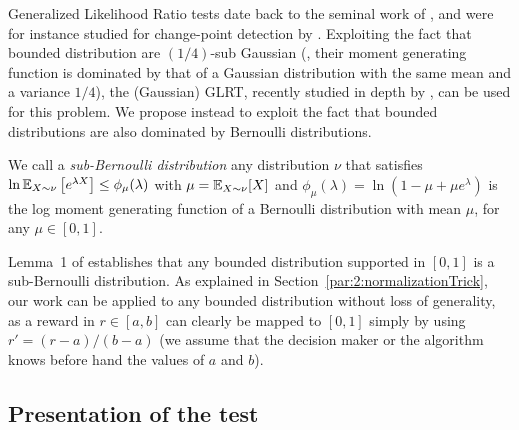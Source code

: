 Generalized Likelihood Ratio tests date back to the seminal work of \cite{Wilks1938}, and were for instance studied for change-point detection by \cite{barnard1959control,siegmund1995using}.
Exploiting the fact that bounded distribution are $(1/4)$-sub Gaussian (\ie, their moment generating function is dominated by that of a Gaussian distribution with the same mean and a variance $1/4$), the (Gaussian) GLRT, recently studied in depth by \cite{Maillard2018GLR}, can be used for this problem.
We propose instead to exploit the fact that bounded distributions are also dominated by Bernoulli distributions.

\begin{definition}\label{def:6:subBernoulliDistributions}
\begin{leftbar}[defnbar]  %
    We call a \emph{sub-Bernoulli distribution} any distribution $\nu$ that satisfies
    $\ln \mathbb{E}_{X\sim\nu}\left[e^{\lambda X}\right] \leq \phi_{\mu}(\lambda)$ with $\mu=\mathbb{E}_{X\sim \nu}[X]$ and $\phi_{\mu}(\lambda) = \ln(1-\mu + \mu e^\lambda)$ is the log moment generating function of a Bernoulli distribution with mean $\mu$, for any $\mu\in[0,1]$.
\end{leftbar}  %
\end{definition}

Lemma~1 of \cite{KLUCBJournal} establishes that any bounded distribution supported in $[0,1]$ is a sub-Bernoulli distribution.
As explained in Section~\ref{par:2:normalizationTrick}, our work can be applied to any bounded distribution without loss of generality, as a reward in $r\in[a,b]$ can clearly be mapped to $[0,1]$ simply by using $r' = (r-a)/(b-a)$ (we assume that the decision maker or the algorithm knows before hand the values of $a$ and $b$).


\subsection{Presentation of the test}\label{sub:6:presentationOfGLRTest}

